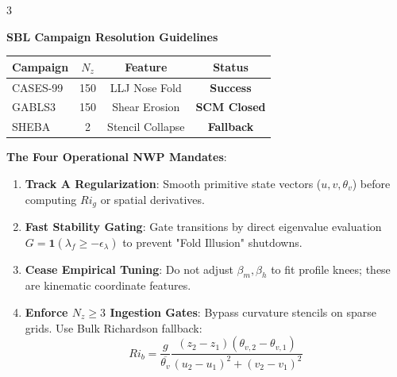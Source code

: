 \documentclass[9pt,landscape,letterpaper]{article}
\begin{document}
\begin{multicols}{3}
\begin{tcolorbox}[cheatsheetbox, title=6. Campaign Reference \& Mandates]
\textbf{SBL Campaign Resolution Guidelines}
\begin{center}
\setlength{\tabcolsep}{3pt}
\footnotesize
\begin{tabular}{lccc}
    \toprule
    \textbf{Campaign} & $N_z$ & \textbf{Feature} & \textbf{Status} \\
    \midrule
    CASES-99 & 150 & LLJ Nose Fold & \textbf{Success} \\
    GABLS3 & 150 & Shear Erosion & \textbf{SCM Closed} \\
    SHEBA & 2 & Stencil Collapse & \textbf{Fallback} \\
    \bottomrule
\end{tabular}
\end{center}
\vskip 0.5mm
\textbf{The Four Operational NWP Mandates}:
\begin{enumerate}
    \item \textbf{Track A Regularization}: Smooth primitive state vectors ($u,v,\theta_v$) before computing $Ri_g$ or spatial derivatives.
    \item \textbf{Fast Stability Gating}: Gate transitions by direct eigenvalue evaluation $G = \mathbf{1}(\lambda_f \ge -\epsilon_\lambda)$ to prevent "Fold Illusion" shutdowns.
    \item \textbf{Cease Empirical Tuning}: Do not adjust $\beta_m, \beta_h$ to fit profile knees; these are kinematic coordinate features.
    \item \textbf{Enforce $N_z \ge 3$ Ingestion Gates}: Bypass curvature stencils on sparse grids. Use Bulk Richardson fallback:
    $$Ri_b = \frac{g}{\overline{\theta_v}} \frac{(z_2 - z_1)(\theta_{v,2} - \theta_{v,1})}{(u_2 - u_1)^2 + (v_2 - v_1)^2}$$
\end{enumerate}
\end{tcolorbox}

\end{multicols}
\end{document}
